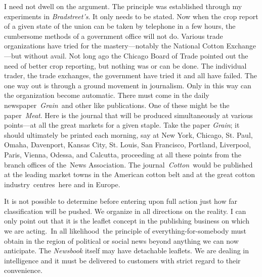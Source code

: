 \documentclass[openany,nobib]{tufte-book}
\begin{document}
I need not dwell on the argument. The principle was established through
my experiments in \emph{Bradstreet's}. It only needs to be stated. Now
when the crop report of a given state of the union can be taken by
telephone in a few hours, the cumbersome methods of a government office
will not do. Various trade organizations have tried for the
mastery---notably the National Cotton Exchange ---but without avail. Not
long ago the Chicago Board of Trade pointed out the need of better crop
reporting, but nothing was or can be done. The individual trader, the
trade exchanges, the government have tried it and all have failed. The
one way out is through a ground movement in journalism. Only in this way
can the organization become automatic. There must come in the daily
newspaper~\emph{Grain}~and other like publications. One of these might
be the paper~\emph{Meat}. Here is the journal that will be produced
simultaneously at various points---at all the great markets for a given
staple. Take the paper \emph{Grain}; it should ultimately be printed
each morning, say at New York, Chicago, St. Paul, Omaha, Davenport,
Kansas City, St. Louis, San Francisco, Portland, Liverpool, Paris,
Vienna, Odessa, and Calcutta, proceeding at all these points from the
branch offices of the~News Association. The journal~\emph{Cotton}~would
be published at the leading market towns in the American cotton belt and
at the great cotton industry~centres~here and in Europe.~

It is not possible to determine before entering upon full action just
how far classification will be pushed. We organize in all directions on
the reality. I can only point out that it is the leaflet concept in the
publishing business on which we are acting.~In all likelihood~the
principle of everything-for-somebody must obtain in the region of
political or social news beyond anything we can now anticipate. The
\emph{Newsbook} itself may have detachable leaflets. We are dealing in
intelligence and it must be delivered to customers with strict regard to
their convenience.~
\end{document}
